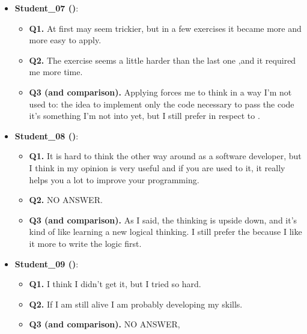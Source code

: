 \begin{itemize}
    \item \textbf{Student\_07 (\tdd)}:
    \begin{itemize}
        \item \textbf{Q1.} At first \tdd may seem trickier, but in a few exercises it became more and more easy to apply.
        \item \textbf{Q2.} The exercise seems a little harder than the last one ,and it required me more time.
        \item \textbf{Q3 (\tdd and \notdd comparison).} Applying \tdd forces me to think in a way I'm not used to: the idea to implement only the code necessary to pass the code it's something I'm not into yet, but I still prefer \tdd in respect to \notdd.
    \end{itemize}

    \item \textbf{Student\_08 (\tdd)}:
    \begin{itemize}
        \item \textbf{Q1.} It is hard to think the other way around as a software developer, but I think in my opinion \tdd is very useful and if you are used to it, it really helps you a lot to improve your programming.
        \item \textbf{Q2.} NO ANSWER.
        \item \textbf{Q3 (\tdd and \notdd comparison).} As I said, the thinking is upside down, and it's kind of like learning a new logical thinking. I still prefer the \notdd because I like it more to write the logic first.
    \end{itemize}

    \item \textbf{Student\_09 (\tdd)}:
    \begin{itemize}
        \item \textbf{Q1.} I think I didn't get it, but I tried so hard.
        \item \textbf{Q2.} If I am still alive I am probably developing my skills.
        \item \textbf{Q3 (\tdd and \notdd comparison).} NO ANSWER,
    \end{itemize}
\end{itemize}
